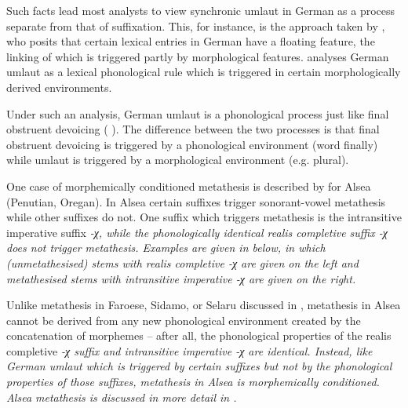 Such facts lead most analysts to view synchronic umlaut in German
as a process separate from that of suffixation.
This, for instance, is the approach taken by \citet[181ff]{wi96},
who posits that certain lexical entries in German have a floating
\tsc{[+front]} feature, the linking of which is triggered partly by morphological features.
\citet{wi96} analyses German umlaut as a lexical phonological rule
which is triggered in certain morphologically derived environments.

Under such an analysis, German umlaut is a phonological process
just like final obstruent devoicing ( ).
The difference between the two processes is that final 
obstruent devoicing is triggered by a phonological environment (word finally)
while umlaut is triggered by a morphological environment (e.g. plural).

One case of morphemically conditioned metathesis is
described by \citet{bu07} for Alsea (Penutian, Oregan).
In Alsea certain suffixes trigger sonorant-vowel metathesis while other suffixes do not.
One suffix which triggers metathesis is the intransitive imperative suffix \it{-χ},
while the phonologically identical realis completive suffix \it{-χ}
does not trigger metathesis.
Examples are given in  below,
in which (unmetathesised) stems with realis completive \it{-χ}
are given on the left and metathesised stems with
intransitive imperative \it{-χ} are given on the right.

\begin{exe}
	\label{ex:AlsMorphemicMet3}
\end{exe}

Unlike metathesis in Faroese, Sidamo, or Selaru discussed
in , metathesis in Alsea cannot be derived
from any new phonological environment created by the concatenation of morphemes
-- after all, the phonological properties of the
realis completive \it{-χ} suffix and intransitive imperative \it{-χ} are identical.
Instead, like German umlaut which is triggered by certain suffixes
but not by the phonological properties of those suffixes,
metathesis in Alsea is morphemically conditioned.
Alsea metathesis is discussed in more detail in .